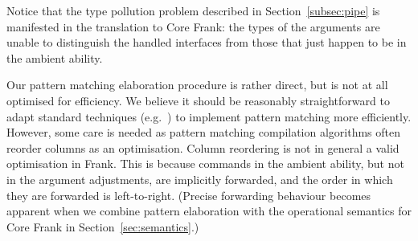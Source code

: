 \documentclass{sigplanconf}
\begin{document}
Notice that the type pollution problem described in
Section~\ref{subsec:pipe} is manifested in the translation to Core
Frank: the types of the arguments are unable to distinguish the handled
interfaces from those that just happen to be in the ambient ability.

Our pattern matching elaboration procedure is rather direct, but is
not at all optimised for efficiency. We believe it should be
reasonably straightforward to adapt standard techniques
(e.g.~\cite{Maranget08}) to implement pattern matching more
efficiently.
%
However, some care is needed as pattern matching compilation
algorithms often reorder columns as an optimisation. Column reordering
is not in general a valid optimisation in Frank. This is because
commands in the ambient ability, but not in the argument adjustments,
are implicitly forwarded, and the order in which they are forwarded is
left-to-right.
%
(Precise forwarding behaviour becomes apparent when we
combine pattern elaboration with the operational semantics for Core
Frank in Section~\ref{sec:semantics}.)

\end{document}
